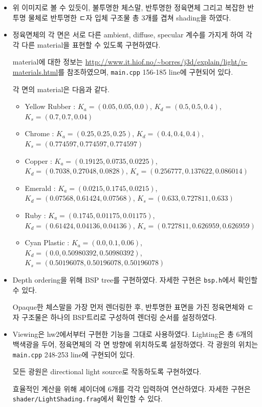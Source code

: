 \documentclass[11pt]{oblivoir}
\begin{document}
\begin{itemize}
\item
  위 이미지로 볼 수 있듯이, 불투명한 체스말, 반투명한 정육면체 그리고 복잡한 반투명 물체로 반투명한 ㄷ자 입체 구조물 총 3개를 겹쳐 shading을 하였다.
\item
  정육면체의 각 면은 서로 다른 ambient, diffuse, specular 계수를 가지게 하여 각각 다른 material을 표현할 수 있도록 구현하였다.

  material에 대한 정보는 \url{http://www.it.hiof.no/~borres/j3d/explain/light/p-materials.html}를 참조하였으며, \verb|main.cpp| 156-185 line에 구현되어 있다.

  각 면의 material은 다음과 같다.
  \begin{itemize}
    \item Yellow Rubber : $K_{a} = (0.05,0.05,0.0)$, $K_{d} = (0.5,0.5,0.4)$, $K_{s} = (0.7,0.7,0.04)$
    \item Chrome : $K_{a} = (0.25, 0.25, 0.25)$, $K_{d} = (0.4,0.4,0.4)$, \\ $K_{s} = (0.774597, 0.774597, 0.774597)$
    \item Copper : $K_{a} = (0.19125, 0.0735, 0.0225)$, $K_{d} = (0.7038, 0.27048, 0.0828)$, $K_{s} = (0.256777, 0.137622, 0.086014)$
    \item Emerald : $K_{a} = (0.0215, 0.1745, 0.0215)$, $K_{d} = (0.07568, 0.61424, 0.07568)$, $K_{s} = (0.633, 0.727811, 0.633)$
    \item Ruby : $K_{a} = (0.1745, 0.01175, 0.01175)$, $K_{d} = (0.61424, 0.04136, 0.04136)$, $K_{s} = (0.727811, 0.626959, 0.626959)$
    \item Cyan Plastic : $K_{a} = (0.0,0.1,0.06)$, $K_{d} = (0.0,0.50980392,0.50980392)$, $K_{s} = (0.50196078,0.50196078,0.50196078)$
  \end{itemize}
\item
  Depth ordering을 위해 BSP tree를 구현하였다. 자세한 구현은 \verb|bsp.h|에서 확인할 수 있다.

  Opaque한 체스말을 가장 먼저 렌더링한 후, 반투명한 표면을 가진 정육면체와 ㄷ자 구조물은 하나의 BSP트리로 구성하여 렌더링 순서를 설정하였다.
\item
  Viewing은 hw2에서부터 구현한 기능을 그대로 사용하였다. Lighting은 총 6개의 백색광을 두어, 정육면체의 각 면 방향에 위치하도록 설정하였다.
  각 광원의 위치는 \verb|main.cpp| 248-253 line에 구현되어 있다.

  모든 광원은 directional light source로 작동하도록 구현하였다.

  효율적인 계산을 위해 셰이더에 6개를 각각 입력하여 연산하였다. 자세한 구현은 \\ \verb|shader/LightShading.frag|에서 확인할 수 있다.

\end{itemize}
\end{document}
